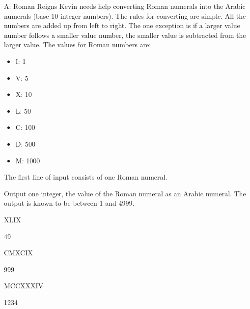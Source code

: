 \begin{problem}{A: Roman Reigns}
Kevin needs help converting Roman numerals into the Arabic numerals (base 10 integer numbers).
The rules for converting are simple. All the numbers are added up from left to right.
The one exception is if a larger value number follows a smaller value number, the smaller value is subtracted from the larger value.
The values for Roman numbers are:
\begin{itemize}
\item I: 1
\item V: 5
\item X: 10
\item L: 50
\item C: 100
\item D: 500
\item M: 1000
\end{itemize}

\end{problem}

\begin{formalin}
The first line of input consists of one Roman numeral. 
\end{formalin}

\begin{formalout}
Output one integer, the value of the Roman numeral as an Arabic numeral.
The output is known to be between 1 and 4999.
\end{formalout}

\begin{datain}
XLIX
\end{datain}
\begin{dataout}
49
\end{dataout}

\begin{datain}
CMXCIX
\end{datain}
\begin{dataout}
999
\end{dataout}

\begin{datain}
MCCXXXIV
\end{datain}
\begin{dataout}
1234
\end{dataout}
